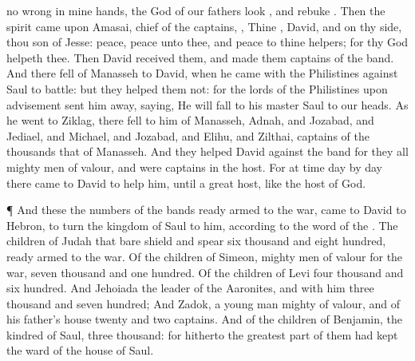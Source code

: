 {{}
no
wrong in mine
hands, the
God of our
fathers
look
{}, and
rebuke
{}.
Then the
spirit
came upon
Amasai,
{}
chief of the
captains,
{}, Thine
{},
David, and on thy side, thou
son of
Jesse:
peace,
peace
{} unto thee, and
peace
{} to thine
helpers; for thy
God
helpeth thee. Then
David
received them, and
made them
captains of the
band.
And there
fell
{} of
Manasseh to
David, when he
came with the
Philistines against
Saul to
battle: but they
helped them not: for the
lords of the
Philistines upon
advisement
sent him away,
saying, He will
fall to his
master
Saul to
{} our
heads.
As he
went to
Ziklag, there
fell to him of
Manasseh,
Adnah, and
Jozabad, and
Jediael, and
Michael, and
Jozabad, and
Elihu, and
Zilthai,
captains of the
thousands that
{} of
Manasseh.
And they
helped
David against the
band
{} for they
{} all mighty
men of
valour, and were
captains in the
host.
For at
{}
time
day by
day there
came to
David to
help him, until
{} a
great
host, like the
host of
God.
\par }{\PP {}¶ And these
{} the
numbers of the
bands
{} ready
armed to the
war,
{}
came to
David to
Hebron, to
turn the
kingdom of
Saul to him, according to the
word of the
{}.
The
children of
Judah that
bare
shield and
spear
{}
six
thousand and
eight
hundred, ready
armed to the
war.
Of the
children of
Simeon, mighty
men of
valour for the
war,
seven
thousand and one
hundred.
Of the
children of
Levi
four
thousand and
six
hundred.
And
Jehoiada
{} the
leader of the
Aaronites, and with him
{}
three
thousand and
seven
hundred;
And
Zadok, a young
man
mighty of
valour, and of his
father’s
house
twenty and
two
captains.
And of the
children of
Benjamin, the
kindred of
Saul,
three
thousand: for hitherto the
greatest part of them had
kept the
ward of the
house of
Saul.
}
